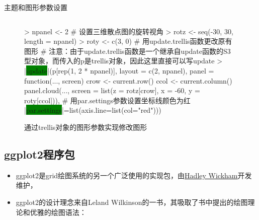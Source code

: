 \begin{frame}[t,fragile]{\subsecname}{主题和图形参数设置}
\begin{overlayarea}{\textwidth}{\textheight}
\begin{onlyenv}
\begin{figure}
\begin{columns}
    \begin{column}[c]{.6\textwidth}
\begin{rcode}
> npanel <- 2
# 设置三维散点图的旋转视角
> rotz <- seq(-30, 30, length = npanel)
> roty <- c(3, 0)
# 用update.trellis函数更改原有图形
# 注意：由于update.trellis函数是一个继承自update函数的S3型对象，而传入的p是trellis对象，因此这里直接可以写update
> |\colorbox{green}{update}|(p[rep(1, 2 * npanel)], 
         layout = c(2, npanel),
         panel = function(..., screen) {
           crow <- current.row()
           ccol <- current.column()
         panel.cloud(..., screen = list(z = rotz[crow], x = -60, y = roty[ccol]))},
         # 用par.settings参数设置坐标线颜色为红 
         |\colorbox{green}{par.settings}|=list(axis.line=list(col="red")))
\end{rcode}
    \end{column}
  \end{columns}
  \caption{通过trellis对象的图形参数实现修改图形}
\end{figure}
\end{onlyenv}
\end{overlayarea}
\end{frame}


\subsection{ggplot2程序包}
\begin{frame}{\subsecname}{}
\begin{itemize}
\item<1-> ggplot2是grid绘图系统的另一个广泛使用的实现包，由\href{http://hadley.nz/}{\uline{Hadley Wickham}}开发维护， 
\item<2-> ggplot2的设计理念来自Leland Wilkinson的一书，其吸取了书中提出的绘图理论和优雅的绘图语法：
\end{itemize}

\begin{overlayarea}{\textwidth}{\textheight}


\end{overlayarea}
\end{frame}

